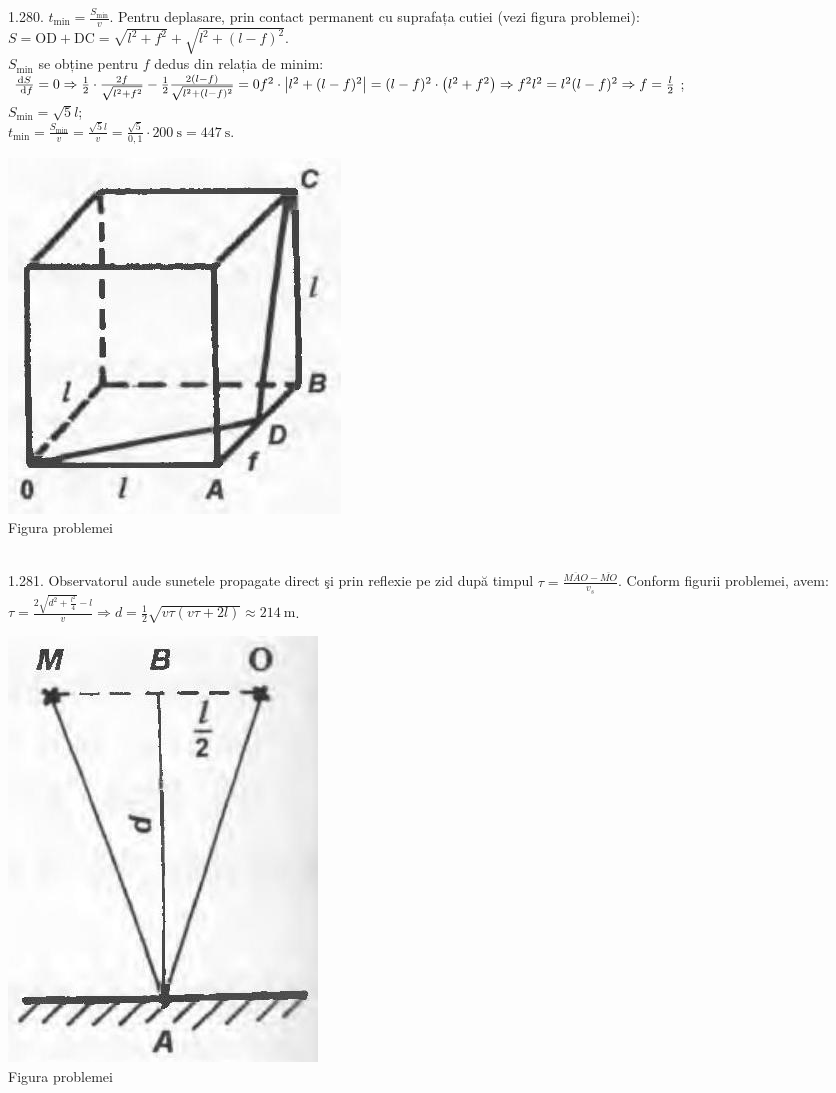 1.280. $t_{\min}=\frac{S_{\min}}{v}$. Pentru deplasare, prin contact permanent cu suprafața cutiei (vezi figura problemei):\\ $S=\mathrm{OD}+\mathrm{DC}=\sqrt{l^{2}+f^{2}}+\sqrt{l^{2}+(l-f)^{2}}$.\\ $S_{\text {min}}$ se obține pentru $f$ dedus din relația de minim:\\ $\frac{\mathrm{d} S}{\mathrm{~d} f}=0 \Rightarrow \frac{1}{2} \cdot \frac{2 f}{\sqrt{l^{2}+f^{2}}}-\frac{1}{2} \frac{2(l-f)}{\sqrt{l^{2}+(l-f)^{2}}}=0\\ f^{2} \cdot\left|l^{2}+(l-f)^{2}\right|=(l-f)^{2} \cdot\left(l^{2}+f^{2}\right) \Rightarrow f^{2} l^{2}=l^{2}(l-f)^{2} \Rightarrow f=\frac{l}{2}$;\\ $S_{\text {min}}=\sqrt{5} l$;\\ $t_{\text {min}}=\frac{S_{\text {min}}}{v}=\frac{\sqrt{5} l}{v}=\frac{\sqrt{5}}{0,1} \cdot 200 \mathrm{~s}=447 \mathrm{~s}$.\\ \begin{center} \includegraphics[width=0.4\linewidth]{images/2025_07_01_5b3ff9fa0d508c8e9f17g-259(1)}\\ Figura problemei \end{center}\\

1.281. Observatorul aude sunetele propagate direct şi prin reflexie pe zid după timpul $\tau=\frac{\overline{M A O}-\overline{M O}}{v_{s}}$. Conform figurii problemei, avem:\\ $\tau=\frac{2 \sqrt{d^{2}+\frac{l^{2}}{4}}-l}{v} \Rightarrow d=\frac{1}{2} \sqrt{v \tau(v \tau+2 l)} \approx 214 \mathrm{~m}$.\\ \begin{center} \includegraphics[width=0.4\linewidth]{images/2025_07_01_5b3ff9fa0d508c8e9f17g-260}\\ Figura problemei \end{center}\\

